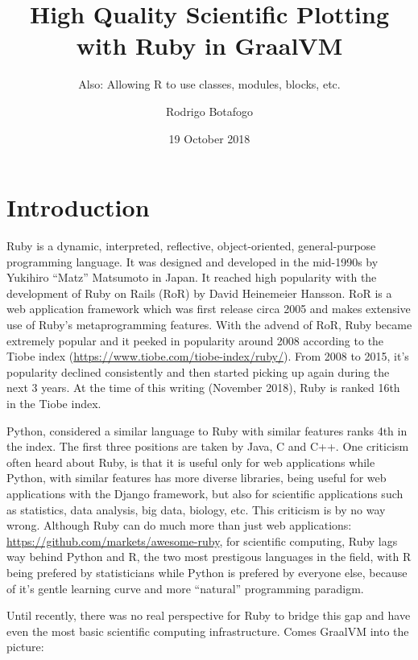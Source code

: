 \documentclass[]{article}
\title{High Quality Scientific Plotting with Ruby in GraalVM}
\subtitle{Also: Allowing R to use classes, modules, blocks, etc.}
\author{Rodrigo Botafogo}
\date{19 October 2018}
\begin{document}
\maketitle

\section{Introduction}\label{introduction}

Ruby is a dynamic, interpreted, reflective, object-oriented,
general-purpose programming language. It was designed and developed in
the mid-1990s by Yukihiro ``Matz'' Matsumoto in Japan. It reached high
popularity with the development of Ruby on Rails (RoR) by David
Heinemeier Hansson. RoR is a web application framework which was first
release circa 2005 and makes extensive use of Ruby's metaprogramming
features. With the advend of RoR, Ruby became extremely popular and it
peeked in popularity around 2008 according to the Tiobe index
(\url{https://www.tiobe.com/tiobe-index/ruby/}). From 2008 to 2015, it's
popularity declined consistently and then started picking up again
during the next 3 years. At the time of this writing (November 2018),
Ruby is ranked 16th in the Tiobe index.

Python, considered a similar language to Ruby with similar features
ranks 4th in the index. The first three positions are taken by Java, C
and C++. One criticism often heard about Ruby, is that it is useful only
for web applications while Python, with similar features has more
diverse libraries, being useful for web applications with the Django
framework, but also for scientific applications such as statistics, data
analysis, big data, biology, etc. This criticism is by no way wrong.
Although Ruby can do much more than just web applications:
\url{https://github.com/markets/awesome-ruby}, for scientific computing,
Ruby lags way behind Python and R, the two most prestigous languages in
the field, with R being prefered by statisticians while Python is
prefered by everyone else, because of it's gentle learning curve and
more ``natural'' programming paradigm.

Until recently, there was no real perspective for Ruby to bridge this
gap and have even the most basic scientific computing infrastructure.
Comes GraalVM into the picture:
\end{document}
